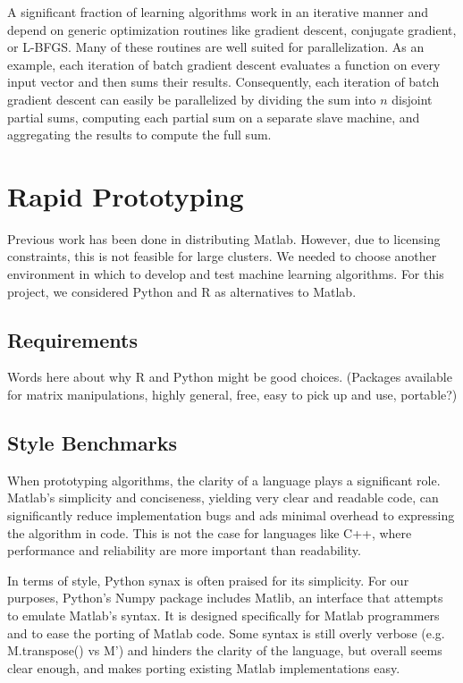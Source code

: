 \documentclass[%
        final,
        notitlepage,
        narroweqnarray,
        inline,
        ]{ieee}
\begin{document}
A significant fraction of learning algorithms work in an iterative manner and
depend on generic optimization routines like gradient descent, conjugate
gradient, or L-BFGS. Many of these routines are well suited for parallelization.
As an example, each iteration of batch gradient descent evaluates a function on
every input vector and then sums their results. Consequently, each iteration of
batch gradient descent can easily be parallelized by dividing the sum into $n$
disjoint partial sums, computing each partial sum on a separate slave machine,
and aggregating the results to compute the full sum.

\section{Rapid Prototyping}

Previous work has been done in distributing Matlab. However, due to licensing
constraints, this is not feasible for large clusters. We needed to choose
another environment in which to develop and test machine learning
algorithms. For this project, we considered Python and R as alternatives to
Matlab.

\subsection{Requirements}

Words here about why R and Python might be good choices. (Packages available
for matrix manipulations, highly general, free, easy to pick up and use,
portable?)


\subsection{Style Benchmarks}

When prototyping algorithms, the clarity of a language plays a significant role.
Matlab's simplicity and conciseness, yielding very clear and readable code, can
significantly reduce implementation bugs and ads minimal overhead to expressing
the algorithm in code. This is not the case for languages like C++, where
performance and reliability are more important than readability.

In terms of style, Python synax is often praised for its simplicity. For our
purposes, Python's Numpy package includes Matlib, an interface that attempts to
emulate Matlab's syntax. It is designed specifically for Matlab programmers and
to ease the porting of Matlab code. Some syntax is still overly verbose (e.g.
M.transpose() vs M') and hinders the clarity of the language, but overall seems
clear enough, and makes porting existing Matlab implementations easy.
\end{document}
